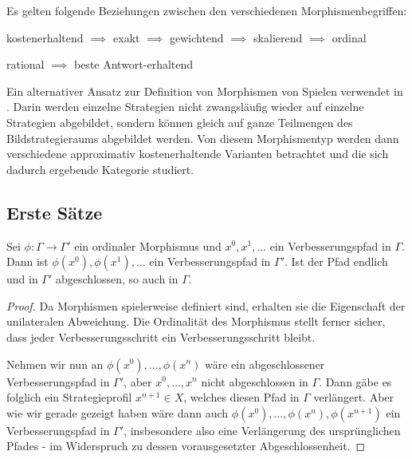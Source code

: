 

\begin{beob}
	Es gelten folgende Beziehungen zwischen den verschiedenen Morphismenbegriffen:
	\begin{center}
		kostenerhaltend $\implies$ exakt $\implies$ gewichtend $\implies$ skalierend $\implies$ ordinal
		
		rational $\implies$ beste Antwort-erhaltend
		
		
	\end{center}
\end{beob}


\begin{bem}
	Ein alternativer Ansatz zur Definition von Morphismen von Spielen verwendet \citeauthor{Foundations} in \cite{Foundations}. Darin werden einzelne Strategien nicht zwangsläufig wieder auf einzelne Strategien abgebildet, sondern können gleich auf ganze Teilmengen des Bildstrategieraums abgebildet werden. Von diesem Morphismentyp werden dann verschiedene \glqq approximativ kostenerhaltende\grqq{} Varianten betrachtet und die sich dadurch ergebende Kategorie studiert.
\end{bem}


\subsection{Erste Sätze}

\begin{prop}\label{prop:ordMorphVerbPf}
	Sei $\phi: \Gamma \to \Gamma'$ ein ordinaler Morphismus und $x^0, x^1, \dots$ ein Verbesserungspfad in $\Gamma$. Dann ist $\phi(x^0), \phi(x^1), \dots$ ein Verbesserungspfad in $\Gamma'$. Ist der Pfad endlich und in $\Gamma'$ abgeschlossen, so auch in $\Gamma$.
\end{prop}

\begin{proof}
	Da Morphismen spielerweise definiert sind, erhalten sie die Eigenschaft der unilateralen Abweichung. Die Ordinalität des Morphismus stellt ferner sicher, dass jeder Verbesserungsschritt ein Verbesserungsschritt bleibt.
	
	Nehmen wir nun an $\phi(x^0), \dots, \phi(x^n)$ wäre ein abgeschlossener Verbesserungspfad in $\Gamma'$, aber $x^0, \dots, x^n$ nicht abgeschlossen in $\Gamma$. Dann gäbe es folglich ein Strategieprofil $x^{n+1} \in X$, welches diesen Pfad in $\Gamma$ verlängert. Aber wie wir gerade gezeigt haben wäre dann auch $\phi(x^0), \dots, \phi(x^n), \phi(x^{n+1})$ ein Verbesserungspfad in $\Gamma'$, insbesondere also eine Verlängerung des ursprünglichen Pfades - im Widerspruch zu dessen vorausgesetzter Abgeschlossenheit.
\end{proof}

